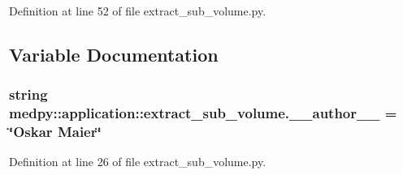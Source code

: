 Definition at line 52 of file extract\_\-sub\_\-volume.py.



\subsection{Variable Documentation}
\hypertarget{namespacemedpy_1_1application_1_1extract__sub__volume_aadbf37c426d7b308cb5bed5ae7bbae11}{
\subsubsection[{\_\-\_\-author\_\-\_\-}]{\setlength{\rightskip}{0pt plus 5cm}string {\bf medpy::application::extract\_\-sub\_\-volume.\_\-\_\-author\_\-\_\-} = \char`\"{}Oskar Maier\char`\"{}}}
\label{namespacemedpy_1_1application_1_1extract__sub__volume_aadbf37c426d7b308cb5bed5ae7bbae11}


Definition at line 26 of file extract\_\-sub\_\-volume.py.

